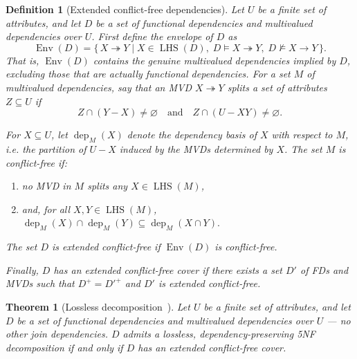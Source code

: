 \documentclass[10pt]{article}
\newtheorem{definition}{Definition}
\newtheorem{theorem}{Theorem}
\begin{document}
\begin{definition}[Extended conflict-free dependencies]
Let \(U\) be a finite set of attributes, and let \(D\) be a set of
functional dependencies and multivalued dependencies over \(U\).
%
First define the envelope of \(D\) as
\[
\operatorname{Env}(D)
=
\{\, X \twoheadrightarrow Y
\mid
X \in \operatorname{LHS}(D),\;
D \models X \twoheadrightarrow Y,\;
D \not\models X \to Y
\,\}.
\]
That is, \(\operatorname{Env}(D)\) contains the genuine multivalued
dependencies implied by \(D\), excluding those that are actually functional
dependencies.
%
For a set \(M\) of multivalued dependencies, say that an MVD
\(
X \twoheadrightarrow Y
\)
splits a set of attributes \(Z \subseteq U\) if
\[
Z \cap (Y - X) \neq \varnothing
\quad\text{and}\quad
Z \cap (U - XY) \neq \varnothing.
\]

For \(X \subseteq U\), let \(\operatorname{dep}_{M}(X)\) denote the
dependency basis of \(X\) with respect to \(M\), i.e. the partition of
\(U-X\) induced by the MVDs determined by \(X\).
%
The set \(M\) is conflict-free if:
\begin{enumerate}
    \item no MVD in $M$ splits any $X \in \operatorname{LHS}(M)$,
    \item and, for all \(X,Y \in \operatorname{LHS}(M)\), 
    $\operatorname{dep}_{M}(X) \cap \operatorname{dep}_{M}(Y)
    \subseteq
    \operatorname{dep}_{M}(X \cap Y).$
\end{enumerate}
%
The set \(D\) is extended conflict-free if \(\operatorname{Env}(D)\) is conflict-free.

Finally, \(D\) has an extended conflict-free cover if there exists a set
\(D'\) of FDs and MVDs such that
$
D^+ = {D'}^+
$
and \(D'\) is extended conflict-free.
\end{definition}

\begin{theorem}[Lossless decomposition~\cite{YuanOzsoyoglu1987LogicalDesign}]
\label{thm:fdmvd}
Let \(U\) be a finite set of attributes, and let \(D\) be a set of
functional dependencies and multivalued dependencies over \(U\) --- no other join dependencies.
\(D\) admits a lossless, dependency-preserving 5NF decomposition if and only if
\(D\) has an extended conflict-free cover.
\end{theorem}

\end{document}

